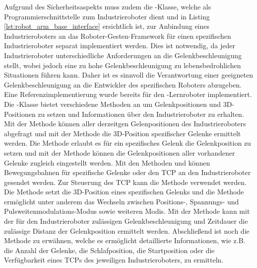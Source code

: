 Aufgrund des Sicherheitsaspekts muss zudem die -Klasse, welche als Programmierschnittstelle zum Industrieroboter dient und in Listing \ref{lst:robot_arm_base_interface} ersichtlich ist, zur Anbindung eines Industrieroboters an das Roboter-Gesten-Framework für einen spezifischen Industrieroboter separat implementiert werden. Dies ist notwendig, da jeder Industrieroboter unterschiedliche Anforderungen an die Gelenkbeschleunigung stellt, wobei jedoch eine zu hohe Gelenkbeschleunigung zu lebensbedrohlichen Situationen führen kann. Daher ist es sinnvoll die Verantwortung einer geeigneten Gelenkbeschleunigung an die Entwickler des spezifischen Roboters abzugeben. Eine Referenzimplementierung wurde bereits für den -Lernroboter implementiert. Die -Klasse bietet verschiedene Methoden an um Gelenkpositionen und 3D-Positionen zu setzen und Informationen über den Industrieroboter zu erhalten. Mit der Methode  können aller derzeitgen Gelenpositionen des Industrieroboters abgefragt und mit der Methode  die 3D-Position spezifischer Gelenke ermittelt werden. Die Methode  erlaubt es für ein spezifisches Gelenk die Gelenkposition zu setzen und mit der Methode  können die Gelenkpositionen aller vorhandener Gelenke zugleich eingestellt werden. Mit den Methoden  und  können Bewegungsbahnen für spezifische Gelenke oder den TCP an den Industrieroboter gesendet werden. Zur Steuerung des TCP kann die Methode  verwendet werden. Die Methode  setzt die 3D-Position eines spezifischen Gelenks und die Methode  ermöglicht unter anderem das Wechseln zwischen Positions-, Spannungs- und Pulsweitenmodulations-Modus sowie weiteren Modis. Mit der Methode  kann mit der für den Industrieroboter zulässigen Gelenkbeschleunigung und Zeitdauer die zulässige Distanz der Gelenkposition ermittelt werden. Abschließend ist noch die Methode  zu erwähnen, welche es ermöglicht detaillierte Informationen, wie z.B. die Anzahl der Gelenke, die Schlafposition, die Startposition oder die Verfügbarkeit eines TCPs des jeweiligen Industrieroboters, zu ermitteln.

